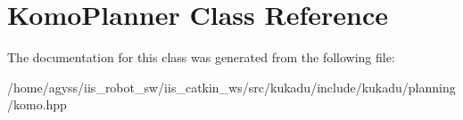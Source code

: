 \hypertarget{classKomoPlanner}{}\section{Komo\+Planner Class Reference}
\label{classKomoPlanner}


The documentation for this class was generated from the following file\+:\begin{DoxyCompactItemize}
\item 
/home/agyss/iis\+\_\+robot\+\_\+sw/iis\+\_\+catkin\+\_\+ws/src/kukadu/include/kukadu/planning/komo.\+hpp\end{DoxyCompactItemize}
